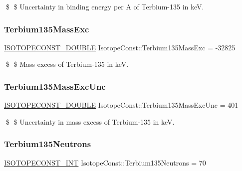 \$ \$ Uncertainty in binding energy per A of Terbium-\/135 in keV. \mbox{\label{group___isotope_const-_terbium-_tb135_ga26b1e8f9d959613b2b389a2386f02061}} 
\subsubsection{\texorpdfstring{Terbium135\+Mass\+Exc}{Terbium135MassExc}}
{\footnotesize\ttfamily \mbox{\hyperlink{group___isotope_const-_macros_ga8f45a7272ce02c0b4c65c44636ed719a}{I\+S\+O\+T\+O\+P\+E\+C\+O\+N\+S\+T\+\_\+\+D\+O\+U\+B\+LE}} Isotope\+Const\+::\+Terbium135\+Mass\+Exc = -\/32825}

\$ \$ Mass excess of Terbium-\/135 in keV. \mbox{\label{group___isotope_const-_terbium-_tb135_gaa51a5dc1b9c224b94ce03a161188e9d2}} 
\subsubsection{\texorpdfstring{Terbium135\+Mass\+Exc\+Unc}{Terbium135MassExcUnc}}
{\footnotesize\ttfamily \mbox{\hyperlink{group___isotope_const-_macros_ga8f45a7272ce02c0b4c65c44636ed719a}{I\+S\+O\+T\+O\+P\+E\+C\+O\+N\+S\+T\+\_\+\+D\+O\+U\+B\+LE}} Isotope\+Const\+::\+Terbium135\+Mass\+Exc\+Unc = 401}

\$ \$ Uncertainty in mass excess of Terbium-\/135 in keV. \mbox{\label{group___isotope_const-_terbium-_tb135_ga4f52abdc47fba74c2ba0660ee3a9ae1b}} 
\subsubsection{\texorpdfstring{Terbium135\+Neutrons}{Terbium135Neutrons}}
{\footnotesize\ttfamily \mbox{\hyperlink{group___isotope_const-_macros_ga5f18360b3e99483a35c32d789e62621c}{I\+S\+O\+T\+O\+P\+E\+C\+O\+N\+S\+T\+\_\+\+I\+NT}} Isotope\+Const\+::\+Terbium135\+Neutrons = 70}

